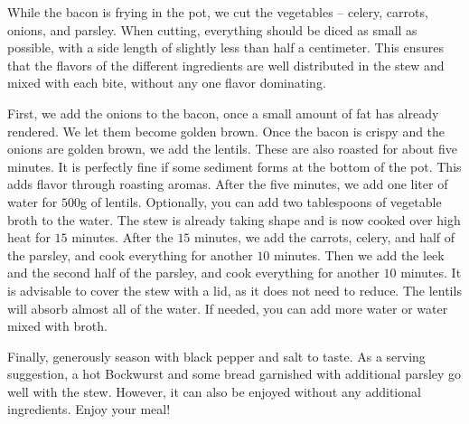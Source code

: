 While the bacon is frying in the pot, we cut the vegetables -- celery, carrots, onions, and parsley. When cutting, everything should be diced as small as possible, with a side length of slightly less than half a centimeter. This ensures that the flavors of the different ingredients are well distributed in the stew and mixed with each bite, without any one flavor dominating.

First, we add the onions to the bacon, once a small amount of fat has already rendered. We let them become golden brown. Once the bacon is crispy and the onions are golden brown, we add the lentils. These are also roasted for about five minutes. It is perfectly fine if some sediment forms at the bottom of the pot. This adds flavor through roasting aromas. After the five minutes, we add one liter of water for $500$g of lentils. Optionally, you can add two tablespoons of vegetable broth to the water. The stew is already taking shape and is now cooked over high heat for $15$ minutes. After the $15$ minutes, we add the carrots, celery, and half of the parsley, and cook everything for another $10$ minutes. Then we add the leek and the second half of the parsley, and cook everything for another $10$ minutes. It is advisable to cover the stew with a lid, as it does not need to reduce. The lentils will absorb almost all of the water. If needed, you can add more water or water mixed with broth.

Finally, generously season with black pepper and salt to taste. As a serving suggestion, a hot Bockwurst and some bread garnished with additional parsley go well with the stew. However, it can also be enjoyed without any additional ingredients. Enjoy your meal!
